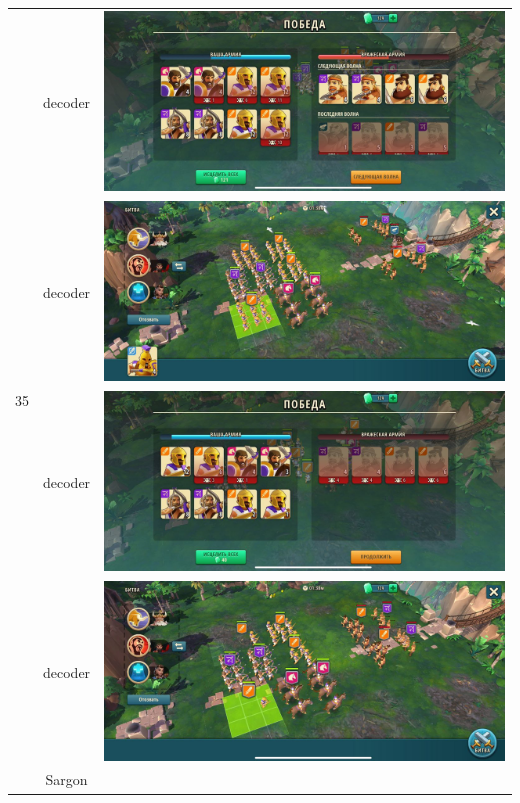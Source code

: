 \begin{longtable}{|c|c|c|}
    \hline
    \multirow{8}{*}{35} & decoder &
    \includegraphics[width=0.75\linewidth]{./parts/media/TreasureHunt/35/decoder/photo_2022-04-07_10-06-08.jpg} \\
    & decoder &
    \includegraphics[width=0.75\linewidth]{./parts/media/TreasureHunt/35/decoder/photo_2022-04-07_10-05-55.jpg} \\
    & decoder &
    \includegraphics[width=0.75\linewidth]{./parts/media/TreasureHunt/35/decoder/photo_2022-04-07_10-06-14.jpg} \\
    & decoder &
    \includegraphics[width=0.75\linewidth]{./parts/media/TreasureHunt/35/decoder/photo_2022-04-07_10-06-11.jpg} \\
    \hline
    \multirow{8}{*}{35} & Sargon &

\end{longtable}
